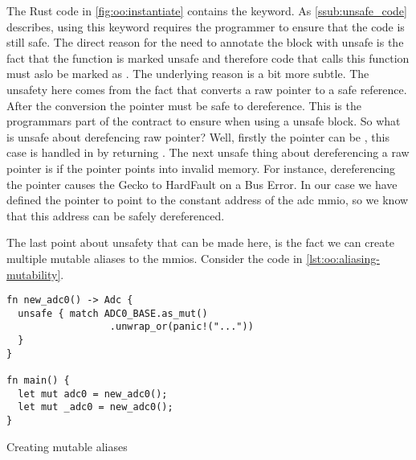 The Rust code in \autoref{fig:oo:instantiate} contains the  keyword.
As \autoref{ssub:unsafe_code} describes, using this keyword requires the programmer to ensure that the code is still safe.
The direct reason for the need to annotate the block with unsafe is the fact that the function  is marked unsafe and therefore code that calls this function must aslo be marked as .
The underlying reason is a bit more subtle.
The unsafety here comes from the fact that  converts a raw pointer to a safe reference.
After the conversion the pointer must be safe to dereference.
This is the programmars part of the contract to ensure when using a unsafe block.
So what is unsafe about derefencing raw pointer?
Well, firstly the pointer can be , this case is handled in  by returning .
The next unsafe thing about dereferencing a raw pointer is if the pointer points into invalid memory.
For instance, dereferencing the pointer   causes the Gecko to HardFault on a Bus Error.
In our case we have defined the pointer to point to the constant address of the \gls{adc} \gls{mmio}, so we know that this address can be safely dereferenced.

The last point about unsafety that can be made here, is the fact we can create multiple mutable aliases to the \glspl{mmio}.
Consider the code in \autoref{lst:oo:aliasing-mutability}.

\begin{listing}[H]
  \begin{verbatim}
fn new_adc0() -> Adc {
  unsafe { match ADC0_BASE.as_mut()
                  .unwrap_or(panic!("..."))
  }
}

fn main() {
  let mut adc0 = new_adc0();
  let mut _adc0 = new_adc0();
}
  \end{verbatim}
  \caption{Creating mutable aliases}
  \label{lst:oo:aliasing-mutability}
\end{listing}
